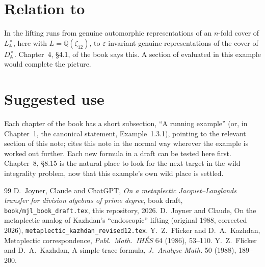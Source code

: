 \documentclass[11pt]{article}
\newcommand{\Q}{\mathbb Q}
\newcommand{\A}{\mathbb A}
\theoremstyle{definition}
\begin{document}
\section{Relation to \cite{JC26}}
In \cite{JC26} the lifting runs from genuine automorphic representations of
an $n$-fold cover of $L_{\A}^\times$, here with $L=\Q(\zeta_{12})$, to
$\varepsilon$-invariant genuine representations of the cover of
$D^\times_{\A}$. Chapter~4, \S4.1, of the book says this. A section of
\cite{JC26} evaluated in this example would complete the picture.

\section*{Suggested use}
Each chapter of the book has a short subsection, ``A running example''
(or, in Chapter~1, the canonical statement, Example~1.3.1), pointing
to the relevant section of this note; \cite{Book26} cites this note
in the normal way wherever the example is worked out further. Each
new formula in a draft can be tested here first. Chapter~8,
\S8.15 is the natural place to look for the next target in the wild
integrality problem, now that this example's own wild place is
settled.

\begin{thebibliography}{99}
 D.~Joyner, Claude and ChatGPT, \emph{On a metaplectic
Jacquet--Langlands transfer for division algebras of prime degree},
book draft, \texttt{book/mjl\_book\_draft.tex}, this repository, 2026.
 D.~Joyner and Claude, On the metaplectic analog of
Kazhdan's ``endoscopic'' lifting (original 1988, corrected 2026),
\texttt{metaplectic\_kazhdan\_revised12.tex}.
 Y.~Z.~Flicker and D.~A.~Kazhdan, Metaplectic
correspondence, \emph{Publ.\ Math.\ IH\'ES} 64 (1986), 53--110.
 Y.~Z.~Flicker and D.~A.~Kazhdan, A simple trace
formula, \emph{J.\ Analyse Math.} 50 (1988), 189--200.
\end{thebibliography}
\end{document}

